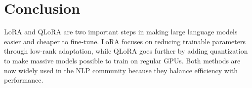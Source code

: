 \documentclass[11pt]{article}
\begin{document}
\section{Conclusion}
LoRA and QLoRA are two important steps in making large language models easier and cheaper to fine-tune. 
LoRA focuses on reducing trainable parameters through low-rank adaptation, 
while QLoRA goes further by adding quantization to make massive models possible to train on regular GPUs. 
Both methods are now widely used in the NLP community because they balance efficiency with performance.
\end{document}
